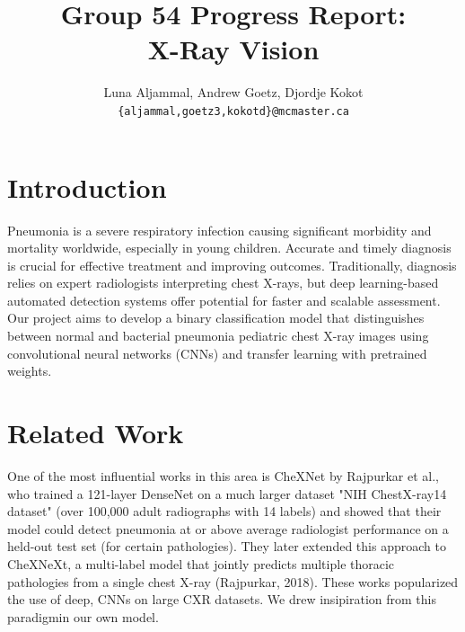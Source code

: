 \documentclass[11pt]{article}
\title{Group 54 Progress Report:\\X-Ray Vision}
\author{Luna Aljammal, Andrew Goetz, Djordje Kokot \\
  \texttt{\{aljammal,goetz3,kokotd\}@mcmaster.ca} }
\begin{document}
\maketitle

\section{Introduction}

Pneumonia is a severe respiratory infection causing significant morbidity and mortality worldwide, especially in young children. Accurate and timely diagnosis is crucial for effective treatment and 
improving outcomes. Traditionally, diagnosis relies on expert radiologists interpreting chest X-rays, but deep learning-based automated detection systems offer potential for faster and scalable assessment. 
Our project aims to develop a binary classification model that distinguishes between normal and bacterial pneumonia pediatric chest X-ray images using convolutional neural networks (CNNs) and transfer learning 
with pretrained weights. 



\section{Related Work}


One of the most influential works in this area is CheXNet by Rajpurkar et al., who trained a 121-layer DenseNet on a much larger dataset "NIH ChestX-ray14 dataset" (over 100,000 adult radiographs with 14 labels) and showed that their model could detect pneumonia at or above average radiologist performance on a held-out test set (for certain pathologies). They later extended this approach to CheXNeXt, a multi-label model that jointly predicts multiple thoracic pathologies from a single chest X-ray (Rajpurkar, 2018). These works popularized the use of deep, CNNs on large CXR datasets. We drew insipiration from this paradigmin our own model.
\end{document}
